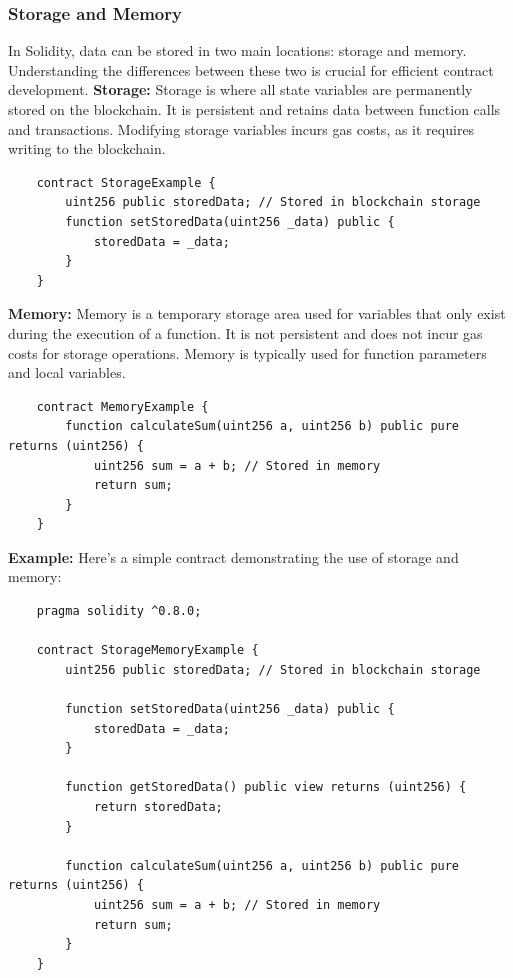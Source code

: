 \documentclass[12pt, a4paper]{article}
\begin{document}
\subsubsection{Storage and Memory}
In Solidity, data can be stored in two main locations: storage and memory. Understanding the differences between these two is crucial for efficient contract development.
\textbf{Storage:} Storage is where all state variables are permanently stored on the blockchain. It is persistent and retains data between function calls and transactions. Modifying storage variables incurs gas costs, as it requires writing to the blockchain.
\begin{verbatim}
    contract StorageExample {
        uint256 public storedData; // Stored in blockchain storage
        function setStoredData(uint256 _data) public {
            storedData = _data;
        }
    }
\end{verbatim}
\textbf{Memory:} Memory is a temporary storage area used for variables that only exist during the execution of a function. It is not persistent and does not incur gas costs for storage operations. Memory is typically used for function parameters and local variables.
\begin{verbatim}
    contract MemoryExample {
        function calculateSum(uint256 a, uint256 b) public pure returns (uint256) {
            uint256 sum = a + b; // Stored in memory
            return sum;
        }
    }
\end{verbatim}
\textbf{Example:}
Here’s a simple contract demonstrating the use of storage and memory:
\begin{verbatim}
    pragma solidity ^0.8.0;

    contract StorageMemoryExample {
        uint256 public storedData; // Stored in blockchain storage

        function setStoredData(uint256 _data) public {
            storedData = _data;
        }

        function getStoredData() public view returns (uint256) {
            return storedData;
        }

        function calculateSum(uint256 a, uint256 b) public pure returns (uint256) {
            uint256 sum = a + b; // Stored in memory
            return sum;
        }
    }
\end{verbatim}
\end{document}
